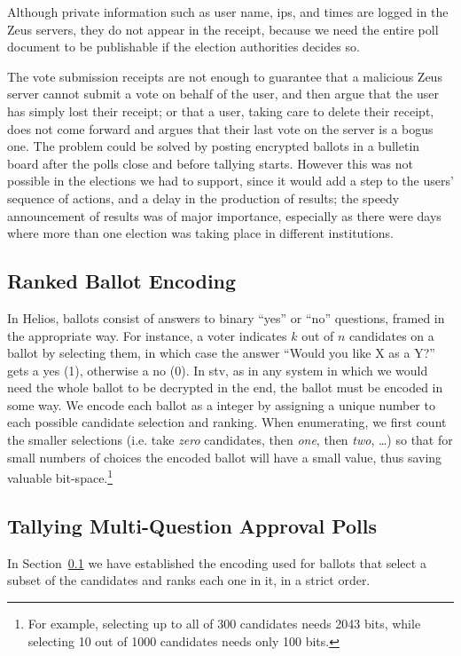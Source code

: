 \documentclass[jets]{usenixjournal}
\begin{document}
Although private information such as user name, {\sc ip}s, and times
are logged in the Zeus servers, they do not appear in the receipt,
because we need the entire poll document to be publishable if
the election authorities decides so.

The vote submission receipts are not enough to guarantee that a
malicious Zeus server cannot submit a vote on behalf of the user, and
then argue that the user has simply lost their receipt; or that a
user, taking care to delete their receipt, does not come forward and
argues that their last vote on the server is a bogus one. The problem
could be solved by posting encrypted ballots in a bulletin board after the
polls close and before tallying starts. However this was not possible
in the elections we had to support, since it would add a step to the
users' sequence of actions, and a delay in the production of results;
the speedy announcement of results was of major importance, especially
as there were days where more than one election was taking place in
different institutions.

\subsection{Ranked Ballot Encoding}
\label{sec:ballot_encoding}
In Helios, ballots consist of answers to binary ``yes'' or ``no''
questions, framed in the appropriate way. For instance, a voter
indicates $k$ out of $n$ candidates on a ballot by selecting them, in
which case the answer ``Would you like X as a Y?'' gets a yes (1),
otherwise a no (0). In {\sc stv}, as in any system in which we would need
the whole ballot to be decrypted in the end, the ballot must be
encoded in some way. We encode each ballot as a integer by assigning a
unique number to each possible candidate selection and ranking. 
When enumerating, we first count the smaller selections (i.e. take
\textit{zero} candidates, then \textit{one}, then \textit{two},
\ldots) so that for small numbers of choices the encoded ballot will
have a small value, thus saving valuable bit-space.\footnote{ For
  example, selecting up to all of 300 candidates needs 2043 bits,
  while selecting 10 out of 1000 candidates needs only 100 bits.}

\subsection{Tallying Multi-Question Approval Polls}
\label{sec:approval_counting}
In Section~\ref{sec:ballot_encoding} we have established the encoding
used for ballots that select a subset of the candidates and ranks each
one in it, in a strict order.
\end{document}
